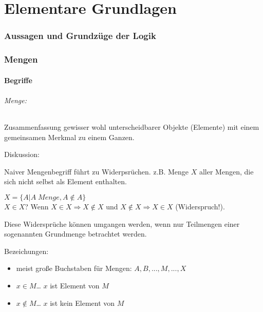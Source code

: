 





\maketitle
\newpage
\tableofcontents
\newpage


\part{Elementare Grundlagen}

\section{Aussagen und Grundzüge der Logik}
%

\section{Mengen}\label{sec:Mengen}

\subsection{Begriffe}

\paragraph{Menge:} Zusammenfassung gewisser wohl unterscheidbarer Objekte (Elemente) mit einem gemeinsamen Merkmal zu einem Ganzen.

\subparagraph{Diskussion:} Naiver Mengenbegriff führt zu Widerpsrüchen. z.B. Menge $X$ aller Mengen, die sich nicht selbst als Element enthalten.

$X=\{A | A \; Menge, A\not\in A\}$\\
$X\in X$? Wenn $X\in X \Rightarrow X\not\in X$ und $X\not\in X\Rightarrow X \in X$ (Widerspruch!).

Diese Widersprüche können umgangen werden, wenn nur Teilmengen einer sogenannten Grundmenge betrachtet werden.

\subparagraph{Bezeichungen:}
\begin{itemize}
\item meist große Buchstaben für Mengen: $A, B, ..., M, ...,X$
\item $\boxed{x\in M}$… $x$ ist Element von $M$
\item $\boxed{x\not\in M}$… $x$ ist kein Element von $M$
\end{itemize}


